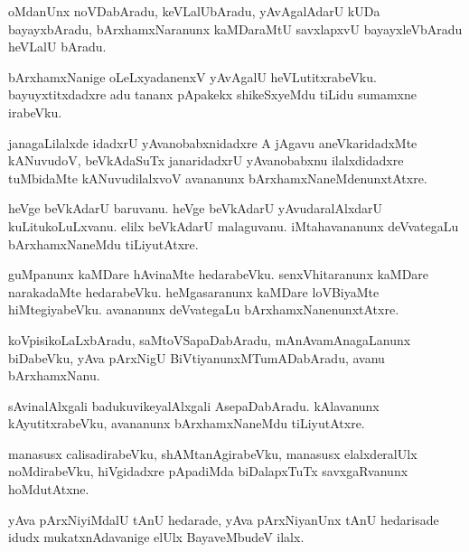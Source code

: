 \documentclass{article}
\begin{document}
\begin{mn}
oMdanUnx noVDabAradu, keVLalUbAradu, yAvAgalAdarU kUDa bayayxbAradu,
bArxhamxNaranunx kaMDaraMtU savxlapxvU bayayxleVbAradu heVLalU bAradu.
\end{mn}

\begin{mn}
bArxhamxNanige oLeLxyadanenxV yAvAgalU
heVLutitxrabeVku. bayuyxtitxdadxre adu tananx pApakekx shikeSxyeMdu
tiLidu sumamxne irabeVku.
\end{mn}

\begin{mn}
janagaLilalxde idadxrU yAvanobabxnidadxre A jAgavu aneVkaridadxMte
kANuvudoV, beVkAdaSuTx janaridadxrU yAvanobabxnu ilalxdidadxre
tuMbidaMte kANuvudilalxvoV avananunx bArxhamxNaneMdenunxtAtxre.
\end{mn}

\begin{mn}%
heVge beVkAdarU baruvanu. heVge beVkAdarU yAvudaralAlxdarU
kuLitukoLuLxvanu. elilx beVkAdarU malaguvanu. iMtahavananunx
deVvategaLu bArxhamxNaneMdu tiLiyutAtxre.
\end{mn}

\begin{mn}
guMpanunx kaMDare hAvinaMte hedarabeVku. senxVhitaranunx kaMDare
narakadaMte hedarabeVku. heMgasaranunx kaMDare loVBiyaMte
hiMtegiyabeVku. avananunx deVvategaLu bArxhamxNanenunxtAtxre.
\end{mn}

\begin{mn}
koVpisikoLaLxbAradu, saMtoVSapaDabAradu, mAnAvamAnagaLanunx biDabeVku,
yAva pArxNigU BiVtiyanunxMTumADabAradu, avanu bArxhamxNanu.
\end{mn}

\begin{mn}
sAvinalAlxgali badukuvikeyalAlxgali AsepaDabAradu. kAlavanunx
kAyutitxrabeVku, avananunx bArxhamxNaneMdu tiLiyutAtxre.
\end{mn}

\begin{mn}
manasusx calisadirabeVku, shAMtanAgirabeVku, manasusx elalxderalUlx
noMdirabeVku, hiVgidadxre pApadiMda biDalapxTuTx savxgaRvanunx hoMdutAtxne.
\end{mn}

\begin{mn}%
yAva pArxNiyiMdalU tAnU hedarade, yAva pArxNiyanUnx tAnU hedarisade
idudx mukatxnAdavanige elUlx BayaveMbudeV ilalx.
\end{mn}
\end{document}
